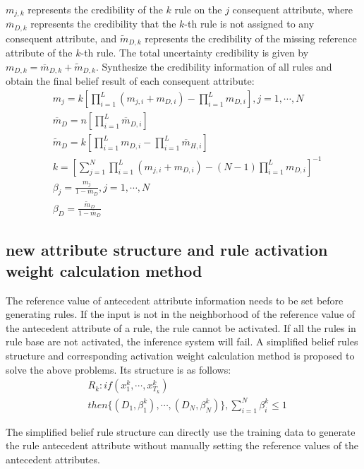 \documentclass{ieeeaccess}
\begin{document}
$m_{j,k}$ represents the credibility of the $k$ rule on the $j$ consequent attribute,
where $\overline{m}_{D,k}$ represents the credibility that the $k$-th rule is not assigned to any consequent attribute,
and $\widetilde{m}_{D,k}$  represents the credibility of the missing reference attribute of the $k$-th rule.
The total uncertainty credibility is given by $m_{D,k}=\overline{m}_{D,k}+\widetilde{m}_{D,k}$.
Synthesize the credibility information of all rules and obtain the final belief result of each consequent attribute:
\begin{align}
     & m_j=k[\prod_{i=1}^L(m_{j,i}+m_{D,i})-\prod_{i=1}^Lm_{D,i}],j=1,\cdots,N       \\
     & \overline{m}_D=n[\prod_{i=1}^L\overline{m}_{D,i}]                             \\
     & \widetilde{m}_D=k[\prod_{i=1}^Lm_{D,i}-\prod_{i=1}^L\overline{m}_{H,i}]       \\
     & k=[\sum_{j=1}^N\prod_{i=1}^L(m_{j,i}+m_{D,i})-(N-1)\prod_{i=1}^Lm_{D,i}]^{-1} \\
     & \beta_j=\frac{m_j}{1-\overline{m}_D},j=1,\cdots,N                             \\
     & \beta_D=\frac{\widetilde{m}_D}{1-\overline{m}_D}
\end{align}

\subsection{new attribute structure and rule activation weight calculation method}
The reference value of antecedent attribute information needs to be set before generating rules.
If the input is not in the neighborhood of the reference value of the antecedent attribute of a rule, the rule cannot be activated.
If all the rules in rule base are not activated, the inference system will fail.
A simplified belief rules structure and corresponding activation weight calculation method is proposed to solve the above problems.
Its structure is as follows:
\begin{equation}
    \begin{split}
        &R_k:if(x_1^k , \cdots , x_{T_k}^k)\\
        &then\{(D_1,\beta_1^k),\cdots,(D_N,\beta_N^k)\},\sum_{i=1}^N\beta_i^k\leq1
    \end{split}
\end{equation}

The simplified belief rule structure can directly use the training data to generate the rule antecedent attribute without manually setting the reference values of the antecedent attributes.
\end{document}

